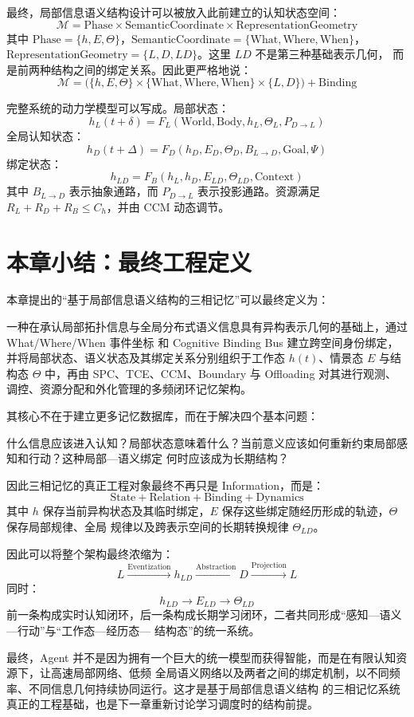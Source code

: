 最终，局部信息语义结构设计可以被放入此前建立的认知状态空间：
\[
\boxed{
\mathcal M
=
\mathrm{Phase}\times\mathrm{SemanticCoordinate}\times\mathrm{RepresentationGeometry}
}
\]
其中 $\mathrm{Phase}=\{h,E,\Theta\}$，$\mathrm{SemanticCoordinate}=\{\mathrm{What},\mathrm{Where},
\mathrm{When}\}$，$\mathrm{RepresentationGeometry}=\{L,D,LD\}$。这里 $LD$ 不是第三种基础表示几何，
而是前两种结构之间的绑定关系。因此更严格地说：
\[
\boxed{
\mathcal M
=
\bigl(
\{h,E,\Theta\}
\times
\{\mathrm{What},\mathrm{Where},\mathrm{When}\}
\times
\{L,D\}
\bigr)
+\mathrm{Binding}
}
\]

完整系统的动力学模型可以写成。局部状态：
\[
\boxed{
h_L(t+\delta)
=
F_L(\mathrm{World},\mathrm{Body},h_L,\Theta_L,P_{D\rightarrow L})
}
\]
全局认知状态：
\[
\boxed{
h_D(t+\Delta)
=
F_D(h_D,E_D,\Theta_D,B_{L\rightarrow D},\mathrm{Goal},\Psi)
}
\]
绑定状态：
\[
\boxed{
h_{LD}
=
F_B(h_L,h_D,E_{LD},\Theta_{LD},\mathrm{Context})
}
\]
其中 $B_{L\rightarrow D}$ 表示抽象通路，而 $P_{D\rightarrow L}$ 表示投影通路。资源满足
$R_L+R_D+R_B\leq C_h$，并由 CCM 动态调节。

\section{本章小结：最终工程定义}

本章提出的“基于局部信息语义结构的三相记忆”可以最终定义为：

\begin{statementbox}
一种在承认局部拓扑信息与全局分布式语义信息具有异构表示几何的基础上，通过 What/Where/When 事件坐标
和 Cognitive Binding Bus 建立跨空间身份绑定，并将局部状态、语义状态及其绑定关系分别组织于工作态
$h(t)$、情景态 $E$ 与结构态 $\Theta$ 中，再由 SPC、TCE、CCM、Boundary 与 Offloading 对其进行观测、
调控、资源分配和外化管理的多频闭环记忆架构。
\end{statementbox}

其核心不在于建立更多记忆数据库，而在于解决四个基本问题：

\begin{statementbox}
什么信息应该进入认知？局部状态意味着什么？当前意义应该如何重新约束局部感知和行动？这种局部—语义绑定
何时应该成为长期结构？
\end{statementbox}

因此三相记忆的真正工程对象最终不再只是 Information，而是：
\[
\boxed{
\mathrm{State}+\mathrm{Relation}+\mathrm{Binding}+\mathrm{Dynamics}
}
\]
其中 $h$ 保存当前异构状态及其临时绑定，$E$ 保存这些绑定随经历形成的轨迹，$\Theta$ 保存局部规律、全局
规律以及跨表示空间的长期转换规律 $\Theta_{LD}$。

因此可以将整个架构最终浓缩为：
\[
\boxed{
L
\xrightarrow{\mathrm{Eventization}}
h_{LD}
\xrightarrow{\mathrm{Abstraction}}
D
\xrightarrow{\mathrm{Projection}}
L
}
\]
同时：
\[
\boxed{
h_{LD}\rightarrow E_{LD}\rightarrow\Theta_{LD}
}
\]
前一条构成实时认知闭环，后一条构成长期学习闭环，二者共同形成“感知—语义—行动”与“工作态—经历态—
结构态”的统一系统。

最终，Agent 并不是因为拥有一个巨大的统一模型而获得智能，而是在有限认知资源下，让高速局部网络、低频
全局语义网络以及两者之间的绑定机制，以不同频率、不同信息几何持续协同运行。这才是基于局部信息语义结构
的三相记忆系统真正的工程基础，也是下一章重新讨论学习调度时的结构前提。
